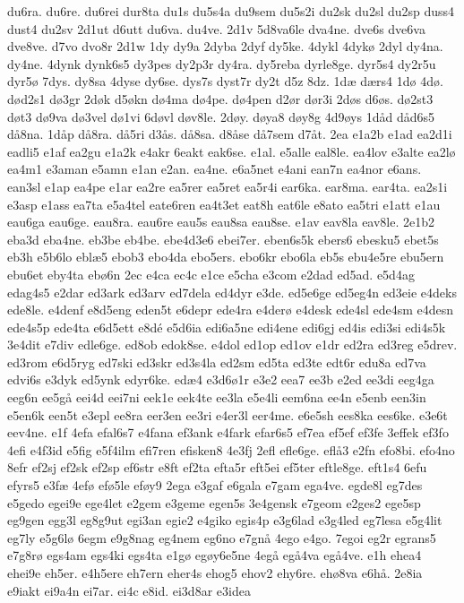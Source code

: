 {du6ra.
du6re.
du6rei
dur8ta
du1s
du5s4a
du9sem
du5s2i
du2sk
du2sl
du2sp
duss4
dust4
du2sv
2d1ut
d6utt
du6va.
du4ve.
2d1v
5d8va6le
dva4ne.
dve6s
dve6va
dve8ve.
d7vo
dvo8r
2d1w
1dy
dy9a
2dyba
2dyf
dy5ke.
4dykl
4dykø
2dyl
dy4na.
dy4ne.
4dynk
dynk6s5
dy3pes
dy2p3r
dy4ra.
dy5reba
dyrle8ge.
dyr5s4
dy2r5u
dyr5ø
7dys.
dy8sa
4dyse
dy6se.
dys7s
dyst7r
dy2t
d5z
8dz.
1dæ
dærs4
1dø
4dø.
død2s1
dø3gr
2døk
d5økn
dø4ma
dø4pe.
dø4pen
d2ør
dør3i
2døs
d6øs.
dø2st3
døt3
dø9va
dø3vel
dø1vi
6døvl
døv8le.
2døy.
døya8
døy8g
4d9øys
1dåd
dåd6s5
då8na.
1dåp
då8ra.
då5ri
d3ås.
då8sa.
d8åse
då7sem
d7åt.
2ea
e1a2b
e1ad
ea2d1i
eadli5
e1af
ea2gu
e1a2k
e4akr
6eakt
eak6se.
e1al.
e5alle
eal8le.
ea4lov
e3alte
ea2lø
ea4m1
e3aman
e5amn
e1an
e2an.
ea4ne.
e6a5net
e4ani
ean7n
ea4nor
e6ans.
ean3sl
e1ap
ea4pe
e1ar
ea2re
ea5rer
ea5ret
ea5r4i
ear6ka.
ear8ma.
ear4ta.
ea2s1i
e3asp
e1ass
ea7ta
e5a4tel
eate6ren
ea4t3et
eat8h
eat6le
e8ato
ea5tri
e1att
e1au
eau6ga
eau6ge.
eau8ra.
eau6re
eau5s
eau8sa
eau8se.
e1av
eav8la
eav8le.
2e1b2
eba3d
eba4ne.
eb3be
eb4be.
ebe4d3e6
ebei7er.
eben6s5k
ebers6
ebesku5
ebet5s
eb3h
e5b6lo
eblæ5
ebob3
ebo4da
ebo5ers.
ebo6kr
ebo6la
eb5s
ebu4e5re
ebu5ern
ebu6et
eby4ta
ebø6n
2ec
e4ca
ec4c
e1ce
e5cha
e3com
e2dad
ed5ad.
e5d4ag
edag4s5
e2dar
ed3ark
ed3arv
ed7dela
ed4dyr
e3de.
ed5e6ge
ed5eg4n
ed3eie
e4deks
ede8le.
e4denf
e8d5eng
eden5t
e6depr
ede4ra
e4derø
e4desk
ede4sl
ede4sm
e4desn
ede4s5p
ede4ta
e6d5ett
e8dé
e5d6ia
edi6a5ne
edi4ene
edi6gj
ed4is
edi3si
edi4s5k
3e4dit
e7div
edle6ge.
ed8ob
edok8se.
e4dol
ed1op
ed1ov
e1dr
ed2ra
ed3reg
e5drev.
ed3rom
e6d5ryg
ed7ski
ed3skr
ed3s4la
ed2sm
ed5ta
ed3te
edt6r
edu8a
ed7va
edvi6s
e3dyk
ed5ynk
edyr6ke.
edæ4
e3d6ø1r
e3e2
eea7
ee3b
e2ed
ee3di
eeg4ga
eeg6n
ee5gå
eei4d
eei7ni
eek1e
eek4te
ee3la
e5e4li
eem6na
ee4n
e5enb
een3in
e5en6k
een5t
e3epl
ee8ra
eer3en
ee3ri
e4er3l
eer4me.
e6e5sh
ees8ka
ees6ke.
e3e6t
eev4ne.
e1f
4efa
efal6s7
e4fana
ef3ank
e4fark
efar6s5
ef7ea
ef5ef
ef3fe
3effek
ef3fo
4efi
e4f3id
e5fig
e5f4ilm
efi7ren
efisken8
4e3fj
2efl
efle6ge.
eflå3
e2fn
efo8bi.
efo4no
8efr
ef2sj
ef2sk
ef2sp
ef6str
e8ft
ef2ta
efta5r
eft5ei
ef5ter
eftle8ge.
eft1s4
6efu
efyrs5
e3fæ
4efø
efø5le
eføy9
2ega
e3gaf
e6gala
e7gam
ega4ve.
egde8l
eg7des
e5gedo
egei9e
ege4let
e2gem
e3geme
egen5s
3e4gensk
e7geom
e2ges2
ege5sp
eg9gen
egg3l
eg8g9ut
egi3an
egie2
e4giko
egis4p
e3g6lad
e3g4led
eg7lesa
e5g4lit
eg7ly
e5g6lø
6egm
e9g8nag
eg4nem
eg6no
e7gnå
4ego
e4go.
7egoi
eg2r
egrans5
e7g8rø
egs4am
egs4ki
egs4ta
e1gø
egøy6e5ne
4egå
egå4va
egå4ve.
e1h
ehea4
ehei9e
eh5er.
e4h5ere
eh7ern
eher4s
ehog5
ehov2
ehy6re.
ehø8va
e6hå.
2e8ia
e9iakt
ei9a4n
ei7ar.
ei4c
e8id.
ei3d8ar
e3idea
}
